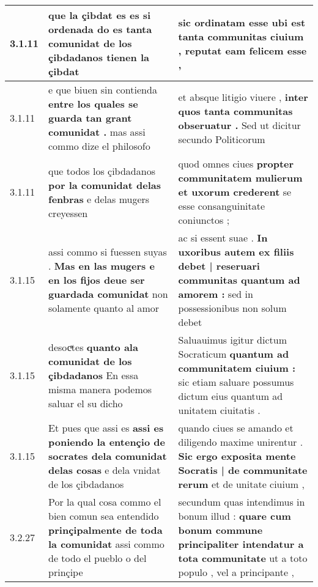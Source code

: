 \begin{tabular}{|p{1cm}|p{6.5cm}|p{6.5cm}|}
3.1.11 & que la çibdat es es si ordenada \textbf{ do es tanta comunidat } de los çibdadanos tienen la çibdat & sic ordinatam esse \textbf{ ubi est tanta communitas ciuium , } reputat eam felicem esse , \\\hline
3.1.11 & e que biuen sin contienda \textbf{ entre los quales se guarda tan grant comunidat . } mas assi commo dize el philosofo & et absque litigio viuere , \textbf{ inter quos tanta communitas obseruatur . } Sed ut dicitur secundo Politicorum \\\hline
3.1.11 & que todos los çibdadanos \textbf{ por la comunidat delas fenbras } e delas mugers creyessen & quod omnes ciues \textbf{ propter communitatem mulierum et uxorum crederent } se esse consanguinitate coniunctos ; \\\hline
3.1.15 & assi commo si fuessen suyas . \textbf{ Mas en las mugers e en los fijos deue ser guardada comunidat } non solamente quanto al amor & ac si essent suae . \textbf{ In uxoribus autem ex filiis debet | reseruari communitas quantum ad amorem : } sed in possessionibus non solum debet \\\hline
3.1.15 & desocͣtes \textbf{ quanto ala comunidat de los çibdadanos } En essa misma manera podemos saluar el su dicho & Saluauimus igitur dictum Socraticum \textbf{ quantum ad communitatem ciuium : } sic etiam saluare possumus dictum eius quantum ad unitatem ciuitatis . \\\hline
3.1.15 & Et pues que assi es \textbf{ assi es poniendo la entençio de socrates dela comunidat delas cosas } e dela vnidat de los çibdadanos & quando ciues se amando et diligendo maxime unirentur . \textbf{ Sic ergo exposita mente Socratis | de communitate rerum } et de unitate ciuium , \\\hline
3.2.27 & Por la qual cosa commo el bien comun sea entendido \textbf{ prinçipalmente de toda la comunidat } assi commo de todo el pueblo o del prinçipe & secundum quas intendimus in bonum illud : \textbf{ quare cum bonum commune principaliter intendatur a tota communitate } ut a toto populo , vel a principante , \\\hline

\end{tabular}
